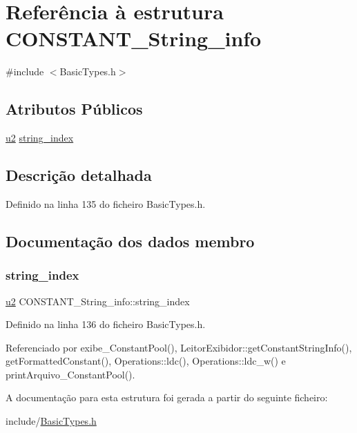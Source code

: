 \hypertarget{structCONSTANT__String__info}{}\section{Referência à estrutura C\+O\+N\+S\+T\+A\+N\+T\+\_\+\+String\+\_\+info}
\label{structCONSTANT__String__info}


{\ttfamily \#include $<$Basic\+Types.\+h$>$}

\subsection*{Atributos Públicos}
\begin{DoxyCompactItemize}
\item 
\hyperlink{BasicTypes_8h_a732cde1300aafb73b0ea6c2558a7a54f}{u2} \hyperlink{structCONSTANT__String__info_a3af668a8c82825626fbf4161636e4155}{string\+\_\+index}
\end{DoxyCompactItemize}


\subsection{Descrição detalhada}


Definido na linha 135 do ficheiro Basic\+Types.\+h.



\subsection{Documentação dos dados membro}
\mbox{\label{structCONSTANT__String__info_a3af668a8c82825626fbf4161636e4155}} 
\subsubsection{\texorpdfstring{string\+\_\+index}{string\_index}}
{\footnotesize\ttfamily \hyperlink{BasicTypes_8h_a732cde1300aafb73b0ea6c2558a7a54f}{u2} C\+O\+N\+S\+T\+A\+N\+T\+\_\+\+String\+\_\+info\+::string\+\_\+index}



Definido na linha 136 do ficheiro Basic\+Types.\+h.



Referenciado por exibe\+\_\+\+Constant\+Pool(), Leitor\+Exibidor\+::get\+Constant\+String\+Info(), get\+Formatted\+Constant(), Operations\+::ldc(), Operations\+::ldc\+\_\+w() e print\+Arquivo\+\_\+\+Constant\+Pool().



A documentação para esta estrutura foi gerada a partir do seguinte ficheiro\+:\begin{DoxyCompactItemize}
\item 
include/\hyperlink{BasicTypes_8h}{Basic\+Types.\+h}\end{DoxyCompactItemize}
